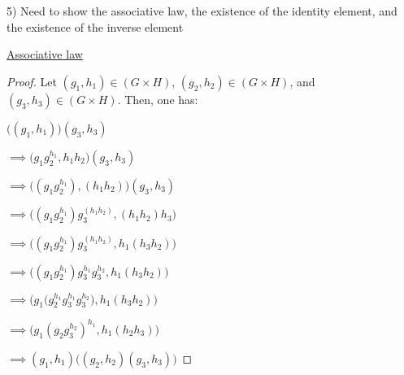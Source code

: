 \documentclass[executivepaper]{article}
\begin{document}
\begin{flushleft}

5) Need to show the associative law, the existence of the identity element, and the existence of the inverse element

\begin{center}

\underline{Associative law}

\begin{proof}

Let $(g_{1}, h_{1}) \in (G \times H)$, $(g_{2}, h_{2}) \in (G \times H)$, and $(g_{3}, h_{3}) \in (G \times H)$. Then, one has:

\vspace{3mm}

$\bigg((g_{1},h_{1})\bigg)(g_{3}, h_{3})$

\vspace{3mm}

$\implies \bigg(g_{1}g_{2}^{h_{1}}, h_{1}h_{2}\bigg)(g_{3}, h_{3})$

\vspace{3mm}

$\implies \bigg((g_{1}g_{2}^{h_{1}}), (h_{1}h_{2})\bigg)(g_{3},h_{3})$

\vspace{3mm}

$\implies \bigg((g_{1}g_{2}^{h_{1}})g_{3}^{(h_{1}h_{2})}, (h_{1}h_{2})h_{3}\bigg)$

\vspace{3mm}

$\implies \bigg((g_{1}g_{2}^{h_{1}})g_{3}^{(h_{1}h_{2})}, h_{1}(h_{3}h_{2})\bigg)$

\vspace{3mm}

$\implies \bigg((g_{1}g_{2}^{h_{1}})g_{3}^{h_{1}}g_{3}^{h_{2}}, h_{1}(h_{3}h_{2})\bigg)$

\vspace{3mm}

$\implies \bigg(g_{1}\bigg(g_{2}^{h_{1}}g_{3}^{h_{1}}g_{3}^{h_{2}}\bigg), h_{1}(h_{3}h_{2})\bigg)$

\pagebreak

\vspace*{-40mm}

$\implies \bigg(g_{1}(g_{2}g_{3}^{h_{2}})^{h_{1}}, h_{1}(h_{2}h_{3})\bigg)$

$\implies (g_{1}, h_{1})\bigg((g_{2}, h_{2})(g_{3}, h_{3})\bigg)$

\vspace{3mm}


\end{proof}
\end{center}
\end{flushleft}
\end{document}
